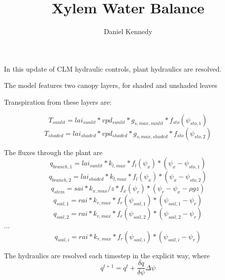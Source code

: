 \documentclass[11pt, oneside]{article}   	%
\title{Xylem Water Balance}
\author{Daniel Kennedy}
\begin{document}
\maketitle

In this update of CLM hydraulic controls, plant hydraulics are resolved.

The model features two canopy layers, for shaded and unshaded leaves

Transpiration from these layers are:

\begin{equation}
T_{sunlit}=lai_{sunlit}*vpd_{sunlit}*g_{s,max,sunlit}*f_{sto}\left(\psi_{sto,1}\right)
\end{equation}
\begin{equation}
T_{shaded}=lai_{shaded}*vpd_{shaded}*g_{s,max,shaded}*f_{sto}\left(\psi_{sto,2}\right)
\end{equation}

The fluxes through the plant are
\begin{equation}
q_{branch,1}=lai_{sunlit}*k_{l,max}*f_l\left(\psi_{x}\right)*\left(\psi_x-\psi_{sto,1}\right)
\end{equation}
\begin{equation}
q_{branch,2}=lai_{shaded}*k_{l,max}*f_l\left(\psi_{x}\right)*\left(\psi_x-\psi_{sto,2}\right)
\end{equation}
\begin{equation}
q_{stem}=sai*k_{x,max}/z*f_x\left(\psi_{r}\right)*\left(\psi_r-\psi_{x}-\rho gz\right)
\end{equation}
\begin{equation}
q_{soil,1}=rai*k_{r,max}*f_r\left(\psi_{soil,1}\right)*\left(\psi_{soil,1}-\psi_{r}\right)
\end{equation}
\begin{equation}
q_{soil,2}=rai*k_{r,max}*f_r\left(\psi_{soil,2}\right)*\left(\psi_{soil,2}-\psi_{r}\right)
\end{equation}
...
\begin{equation}
q_{soil,i}=rai*k_{r,max}*f_r\left(\psi_{soil,i}\right)*\left(\psi_{soil,i}-\psi_{r}\right)
\end{equation}

The hydraulics are resolved each timestep in the explicit way, where
\begin{equation}
q^{t+1}=q^{t}+\dfrac{\delta q}{\delta \psi} \Delta \psi
\end{equation}
\end{document}
